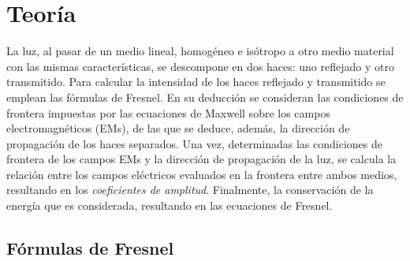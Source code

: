 \chapter{Teoría}

La luz, al pasar de un medio lineal, homogéneo e isótropo a otro medio material con las mismas características, se descompone en dos haces: uno reflejado y otro transmitido. Para calcular la intensidad de los haces reflejado y transmitido se emplean las fórmulas de Fresnel. En su deducción se consideran las condiciones de frontera impuestas por las ecuaciones de Maxwell sobre los campos electromagnéticos (EMs), de las que se deduce, además, la dirección de propagación de los haces separados.  Una vez, determinadas las condiciones de frontera de los campos EMs y la dirección de propagación de la luz, se calcula la relación  entre los campos eléctricos evaluados en la frontera entre ambos medios, resultando en los \emph{coeficientes de amplitud}. Finalmente, la conservación de la energía que es considerada, resultando en las ecuaciones de Fresnel.


\section{Fórmulas de Fresnel}

